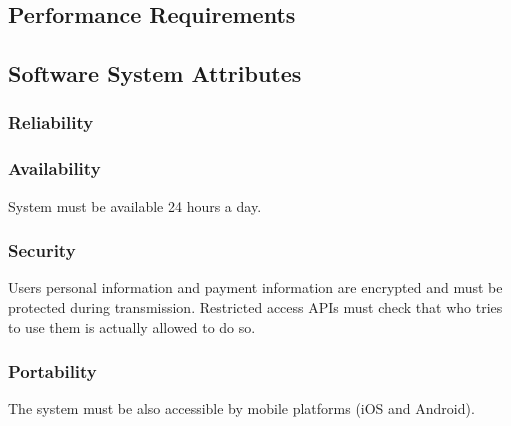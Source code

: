 \subsection{Performance Requirements}
\subsection{Software System Attributes}
	\subsubsection{Reliability}
	\subsubsection{Availability}
	System must be available 24 hours a day.
	\subsubsection{Security}
	Users personal information and payment information are encrypted and must be protected during transmission.
	Restricted access APIs must check that who tries to use them is actually allowed to do so.
	\subsubsection{Portability}
	The system must be also accessible by mobile platforms (iOS and Android).

